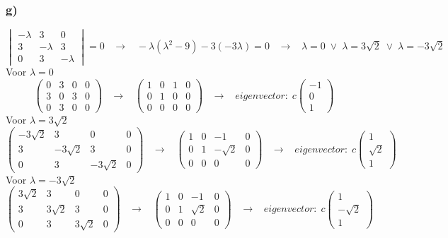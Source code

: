 \documentclass[11pt]{article}
\begin{document}
\subsubsection*{g)}
\[
\begin{vmatrix}
-\lambda & 3 & 0 \\
3 & -\lambda & 3 \\
0 & 3 & -\lambda
\end{vmatrix}
=0
\;\;\;\longrightarrow\;\;\;
-\lambda(\lambda^2-9)-3(-3\lambda)=0
\;\;\;\longrightarrow\;\;\;
\lambda = 0 \;\vee\; \lambda = 3\sqrt{2} \;\vee\; \lambda = -3\sqrt{2}
\]
Voor $\lambda = 0$
\[
\left(
\begin{array}{ccc|c}
0 & 3 & 0 & 0\\
3 & 0 & 3 & 0\\
0 & 3 & 0 & 0
\end{array}
\right)
\;\;\;\longrightarrow\;\;\;
\left(
\begin{array}{ccc|c}
1 & 0 & 1 & 0 \\
0 & 1 & 0 & 0 \\
0 & 0 & 0 & 0
\end{array}
\right)
\;\;\;\longrightarrow\;\;\;
eigenvector:\;
c
\begin{pmatrix}
-1\\0\\1
\end{pmatrix}
\]
Voor $\lambda = 3\sqrt{2}$
\[
\left(
\begin{array}{ccc|c}
-3\sqrt{2} & 3 & 0 & 0\\
3 & -3\sqrt{2} & 3 & 0\\
0 & 3 & -3\sqrt{2} & 0
\end{array}
\right)
\;\;\;\longrightarrow\;\;\;
\left(
\begin{array}{ccc|c}
1 & 0 & -1 & 0 \\
0 & 1 & -\sqrt{2} & 0 \\
0 & 0 & 0 & 0
\end{array}
\right)
\;\;\;\longrightarrow\;\;\;
eigenvector:\;
c
\begin{pmatrix}
1\\\sqrt{2}\\1
\end{pmatrix}
\]
Voor $\lambda = -3\sqrt{2}$
\[
\left(
\begin{array}{ccc|c}
3\sqrt{2} & 3 & 0 & 0\\
3 & 3\sqrt{2} & 3 & 0\\
0 & 3 & 3\sqrt{2} & 0
\end{array}
\right)
\;\;\;\longrightarrow\;\;\;
\left(
\begin{array}{ccc|c}
1 & 0 & -1 & 0 \\
0 & 1 & \sqrt{2} & 0 \\
0 & 0 & 0 & 0
\end{array}
\right)
\;\;\;\longrightarrow\;\;\;
eigenvector:\;
c
\begin{pmatrix}
1\\-\sqrt{2}\\1
\end{pmatrix}
\]
\end{document}

